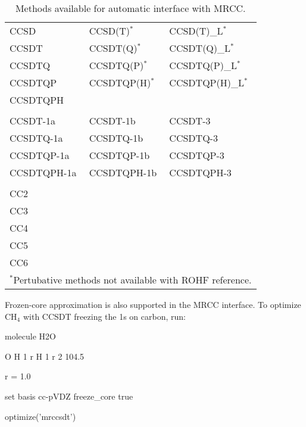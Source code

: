 \begin{table}
\caption{Methods available for automatic interface with MRCC.} 
\label{table:mrccauto}
\begin{center}
\small
\begin{tabular}{lll} \hline\hline
CCSD        & CCSD(T)$^*$      & CCSD(T)\_L$^*$    \\
CCSDT       & CCSDT(Q)$^*$     & CCSDT(Q)\_L$^*$   \\
CCSDTQ      & CCSDTQ(P)$^*$    & CCSDTQ(P)\_L$^*$  \\
CCSDTQP     & CCSDTQP(H)$^*$   & CCSDTQP(H)\_L$^*$ \\
CCSDTQPH    &                  &                   \\
            &                  &                   \\
CCSDT-1a    & CCSDT-1b         & CCSDT-3           \\
CCSDTQ-1a   & CCSDTQ-1b        & CCSDTQ-3          \\
CCSDTQP-1a  & CCSDTQP-1b       & CCSDTQP-3         \\
CCSDTQPH-1a & CCSDTQPH-1b      & CCSDTQPH-3        \\
            &                  &                   \\
CC2         &                  &                   \\
CC3         &                  &                   \\
CC4         &                  &                   \\
CC5         &                  &                   \\
CC6         &                  &                   \\
\hline\hline
\multicolumn{3}{l}{
\footnotesize{$^*$Pertubative methods not available with ROHF reference.}
}
\end{tabular}
\end{center}
\end{table}

Frozen-core approximation is also supported in the MRCC interface. To optimize CH$_4$ with CCSDT freezing the 1s on carbon, run:

\begin{Snippet}
molecule H2O {
    O
    H 1 r
    H 1 r 2 104.5

    r = 1.0
}

set {
    basis cc-pVDZ
    freeze_core true
}

optimize('mrccsdt')
\end{Snippet}
